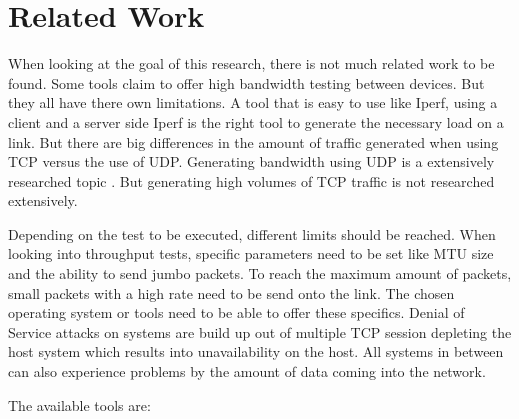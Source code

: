 \section{Related Work}

When looking at the goal of this research, there is not much related work to be found. 
Some tools claim to offer high bandwidth testing between devices. But they all have there own limitations. 
A tool that is easy to use like Iperf, using a client and a server side Iperf is the right tool to generate the necessary load on a link. But there are big differences in the amount of traffic generated when using TCP versus the use of UDP.
Generating bandwidth using UDP is a extensively researched topic . But generating high volumes of TCP traffic is not researched extensively.  

Depending on the test to be executed, different limits should be reached. 
When looking into throughput tests, specific parameters need to be set like MTU size and the ability to send jumbo packets.
To reach the maximum amount of packets, small packets with a high rate need to be send onto the link. The chosen operating system or tools need to be able to offer these specifics.
Denial of Service attacks on systems are build up out of multiple TCP session depleting the host system which results into unavailability on the host. All systems in between can also experience problems by the amount of data coming into the network.

The available tools are:


